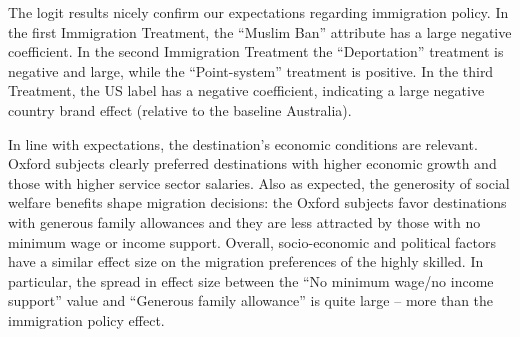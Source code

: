\documentclass[12pt]{article}
\begin{document}
\begin{comment}
  & (0.150) & (0.154) & (0.164) \\ 
  University Ranking 90th pc & 0.476$^{***}$ & 0.122 & 0.183 \\ 
  & (0.151) & (0.157) & (0.158) \\ 
  Likelihood of emigrating & $-$0.012 & 0.023$^{*}$ & 0.014 \\ 
  & (0.014) & (0.014) & (0.011) \\ 
  Constant & $-$0.092 & 0.003 & $-$0.019 \\ 
  & (0.213) & (0.199) & (0.201) \\ 
 \hline \\[-1.8ex] 
Observations & 1,170 & 1,170 & 1,170 \\ 
Log Likelihood & $-$731.956 & $-$740.916 & $-$759.410 \\ 
Akaike Inf. Crit. & 1,487.913 & 1,505.832 & 1,542.820 \\   
\hline 
\hline \\[-1.8ex] 
\multicolumn{4}{l}{ \textit{Note:} $^{*}$p$<$0.1; $^{**}$p$<$0.05; $^{***}$p$<$0.01 }  \\ 
\multicolumn{4}{l}{\textit{Standard errors clustered by participant}}
\end{tabular} 
\end{table} 

\end{comment}


\par The logit results nicely confirm our expectations regarding immigration policy. In the first Immigration Treatment, the ``Muslim Ban'' attribute has a large negative coefficient. In the second Immigration Treatment the ``Deportation'' treatment is negative and large, while the ``Point-system'' treatment is positive. In the third Treatment, the US label has a negative coefficient, indicating a large negative country brand effect (relative to the baseline Australia). 

\par In line with expectations, the destination's economic conditions are relevant. Oxford subjects clearly preferred destinations with higher economic growth and those with higher service sector salaries.  Also as expected, the generosity of social welfare benefits shape migration decisions: the Oxford subjects favor destinations with generous family allowances and they are less attracted by those with no minimum wage or income support. Overall, socio-economic and political factors have a similar effect size on the migration preferences of the highly skilled. In particular, the spread in effect size between the ``No minimum wage/no income support'' value and ``Generous family allowance'' is quite large -- more than the immigration policy effect.
\end{document}
